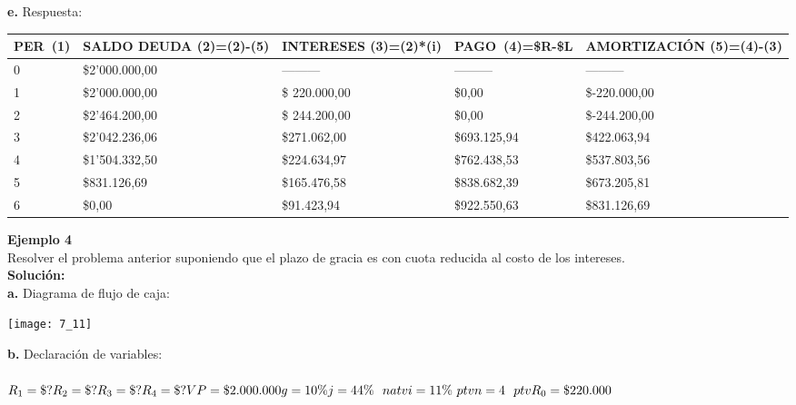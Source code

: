 \textbf{e.} Respuesta:
\begin{spacing}{1.1}
    \begin{center}
        \begin{tabular}{|p{1cm}|p{2cm}|p{2cm}|p{2cm}|p{3cm}|}
        \hline 
        \rowcolor{white!50}
            \textbf{PER\ (1)} & \textbf{SALDO DEUDA (2)=(2)-(5)} & \textbf{INTERESES  (3)=(2)*(i)}& \textbf{PAGO\ (4)=\$R-\$L }& \textbf{AMORTIZACIÓN  (5)=(4)-(3)} \\ \hline                        

            0 & \$2'000.000,00 & --------- & --------- & ---------\\ \hline 
            1 & \$2'000.000,00  &\$ 220.000,00  & \$0,00  & \$-220.000,00 \\ \hline
            2 & \$2'464.200,00  &\$ 244.200,00  & \$0,00  & \$-244.200,00 \\ \hline
            3 & \$2'042.236,06 & \$271.062,00  & \$693.125,94 & \$422.063,94 \\ \hline
            4 & \$1'504.332,50  & \$224.634,97  & \$762.438,53  & \$537.803,56\\ \hline
            5 & \$831.126,69  & \$165.476,58  & \$838.682,39  & \$673.205,81 \\ \hline
            6 & \$0,00  & \$91.423,94  & \$922.550,63  & \$831.126,69 \\ \hline

 
\end{tabular}
\end{center}
\end{spacing}

\textbf{Ejemplo 4}\\
Resolver el problema anterior suponiendo que el plazo de gracia es con cuota reducida al costo de los intereses.\\

\textbf{Solución:}\\
\textbf{a.} Diagrama de flujo de caja:
\begin{center}
	\texttt{[image: 7\_11]}
\end{center}
\textbf{b.} Declaración de variables:\\\\

	$R_{1}  = \$?\\
	R_{2}  = \$?\\
	R_{3}  = \$?\\
	R_{4}  = \$?\\
	VP=\$2.000.000 \\
	g=10 \%\ \\
	j=44 \% \ \ natv\\
	i=11 \%\ ptv\ \\
	n=4 \ \ ptv\\
	R_{0}=\$ 220.000$\\

